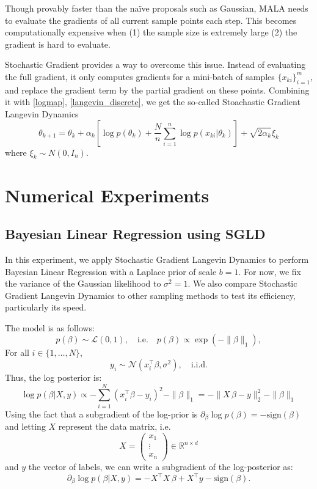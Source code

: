 \documentclass[10pt]{amsart}
\begin{document}
Though provably faster than the na\"ive proposals such as Gaussian, MALA needs to evaluate the gradients of all current sample points each step. This becomes computationally expensive when (1) the sample size is extremely large (2) the gradient is hard to evaluate.

Stochastic Gradient provides a way to overcome this issue. Instead of evaluating the full gradient, it only computes gradients for a mini-batch of samples $\{x_{ki}\}_{i=1}^m$, and replace the gradient term by the partial gradient on these points. Combining it with \eqref{logmap}, \eqref{langevin_discrete}, we get the so-called Stoachastic Gradient Langevin Dynamics 
\begin{equation}\label{SGLD}
    \theta_{k+1}=\theta_k + \alpha_k\left[\log p(\theta_k)+\frac{N}{n}\sum_{i=1}^n \log p(x_{ki}|\theta_k)\right]+\sqrt{2\alpha_k}\xi_k    
\end{equation}
where $\xi_k\sim N(0,I_n)$.

\section{Numerical Experiments}
\subsection{Bayesian Linear Regression using SGLD}

In this experiment, we apply Stochastic Gradient Langevin Dynamics to perform Bayesian Linear Regression with a Laplace prior of scale \( b=1 \). For now, we fix the variance of the Gaussian likelihood to \( \sigma^2=1 \). We also compare Stochastic Gradient Langevin Dynamics to other sampling methods to test its efficiency, particularly its speed.

The model is as follows:
\[
p(\beta) \sim \mathcal{L}(0, 1), \quad \text{i.e.} \quad p(\beta) \propto \exp(-\|\beta\|_1),
\]
For all \( i \in \{1, \dots, N\} \), 
\[
y_i \sim \mathcal{N}(x_i^{\top}\beta, \sigma^2), \quad \text{i.i.d.}
\]
Thus, the log posterior is:
\[
\log p(\beta | X, y) \propto - \sum_{i=1}^N (x_i^{\top}\beta - y_i)^2 - \|\beta \|_1 = - \|X\, \beta - y\|_2^2 - \|\beta \|_1
\]
Using the fact that a subgradient of the log-prior is \( \partial_{\beta} \log p(\beta) = - \mathrm{sign}(\beta) \) and letting \( X \) represent the data matrix, i.e.
\[
X = \begin{pmatrix}
x_1\\
\vdots\\
x_n
\end{pmatrix} \in \mathbb{R}^{n \times d}
\]
and \( y \) the vector of labels, we can write a subgradient of the log-posterior as:
\[
\partial_{\beta} \log p(\beta | X, y) = - X^{\top}X \, \beta + X^{\top}y - \mathrm{sign}(\beta).
\]
\end{document}

